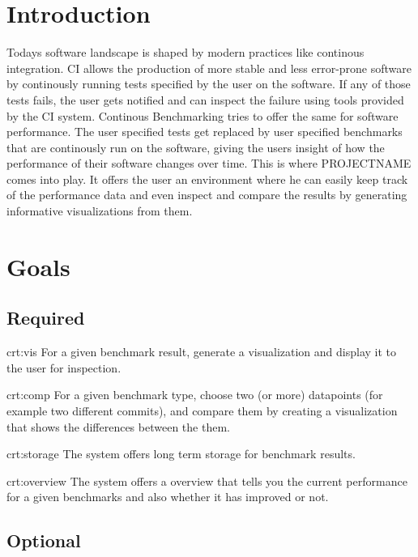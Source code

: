 \section{Introduction}

Todays software landscape is shaped by modern practices like continous integration. CI allows the production of more stable and less error-prone software by continously running tests specified by the user on the software. If any of those tests fails, the user gets notified and can inspect the failure using tools provided by the CI system. Continous Benchmarking tries to offer the same for software performance. The user specified tests get replaced by user specified benchmarks that are continously run on the software, giving the users insight of how the performance of their software changes over time. This is where PROJECTNAME comes into play. It offers the user an environment where he can easily keep track of the performance data and even inspect and compare the results by generating informative visualizations from them. 

\section{Goals}

\subsection{Required}

{crt:vis}
{For a given benchmark result, generate a \gls{visualization} and display it to the user for inspection.}

{crt:comp}
{For a given benchmark type, choose two (or more) datapoints (for example two different commits), and compare them by creating a visualization that shows the differences between the them.}

{crt:storage}
{The system offers long term storage for benchmark results.}

{crt:overview}
{The system offers a overview that tells you the current performance for a given benchmarks and also whether it has improved or not.}


\subsection{Optional}

